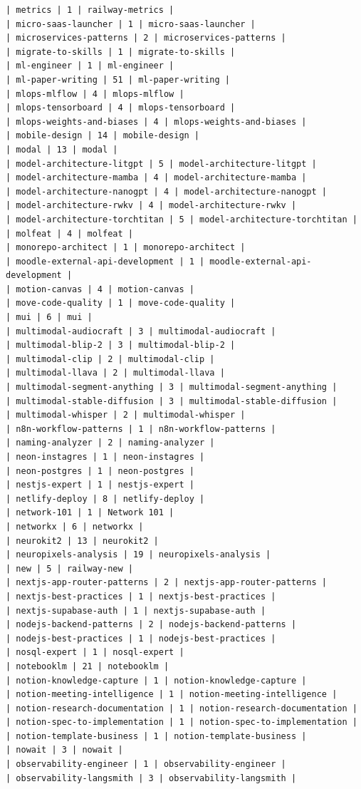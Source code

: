\begin{Verbatim}[breaklines,breakanywhere,fontsize=\footnotesize]
| metrics | 1 | railway-metrics |
| micro-saas-launcher | 1 | micro-saas-launcher |
| microservices-patterns | 2 | microservices-patterns |
| migrate-to-skills | 1 | migrate-to-skills |
| ml-engineer | 1 | ml-engineer |
| ml-paper-writing | 51 | ml-paper-writing |
| mlops-mlflow | 4 | mlops-mlflow |
| mlops-tensorboard | 4 | mlops-tensorboard |
| mlops-weights-and-biases | 4 | mlops-weights-and-biases |
| mobile-design | 14 | mobile-design |
| modal | 13 | modal |
| model-architecture-litgpt | 5 | model-architecture-litgpt |
| model-architecture-mamba | 4 | model-architecture-mamba |
| model-architecture-nanogpt | 4 | model-architecture-nanogpt |
| model-architecture-rwkv | 4 | model-architecture-rwkv |
| model-architecture-torchtitan | 5 | model-architecture-torchtitan |
| molfeat | 4 | molfeat |
| monorepo-architect | 1 | monorepo-architect |
| moodle-external-api-development | 1 | moodle-external-api-development |
| motion-canvas | 4 | motion-canvas |
| move-code-quality | 1 | move-code-quality |
| mui | 6 | mui |
| multimodal-audiocraft | 3 | multimodal-audiocraft |
| multimodal-blip-2 | 3 | multimodal-blip-2 |
| multimodal-clip | 2 | multimodal-clip |
| multimodal-llava | 2 | multimodal-llava |
| multimodal-segment-anything | 3 | multimodal-segment-anything |
| multimodal-stable-diffusion | 3 | multimodal-stable-diffusion |
| multimodal-whisper | 2 | multimodal-whisper |
| n8n-workflow-patterns | 1 | n8n-workflow-patterns |
| naming-analyzer | 2 | naming-analyzer |
| neon-instagres | 1 | neon-instagres |
| neon-postgres | 1 | neon-postgres |
| nestjs-expert | 1 | nestjs-expert |
| netlify-deploy | 8 | netlify-deploy |
| network-101 | 1 | Network 101 |
| networkx | 6 | networkx |
| neurokit2 | 13 | neurokit2 |
| neuropixels-analysis | 19 | neuropixels-analysis |
| new | 5 | railway-new |
| nextjs-app-router-patterns | 2 | nextjs-app-router-patterns |
| nextjs-best-practices | 1 | nextjs-best-practices |
| nextjs-supabase-auth | 1 | nextjs-supabase-auth |
| nodejs-backend-patterns | 2 | nodejs-backend-patterns |
| nodejs-best-practices | 1 | nodejs-best-practices |
| nosql-expert | 1 | nosql-expert |
| notebooklm | 21 | notebooklm |
| notion-knowledge-capture | 1 | notion-knowledge-capture |
| notion-meeting-intelligence | 1 | notion-meeting-intelligence |
| notion-research-documentation | 1 | notion-research-documentation |
| notion-spec-to-implementation | 1 | notion-spec-to-implementation |
| notion-template-business | 1 | notion-template-business |
| nowait | 3 | nowait |
| observability-engineer | 1 | observability-engineer |
| observability-langsmith | 3 | observability-langsmith |

\end{Verbatim}
